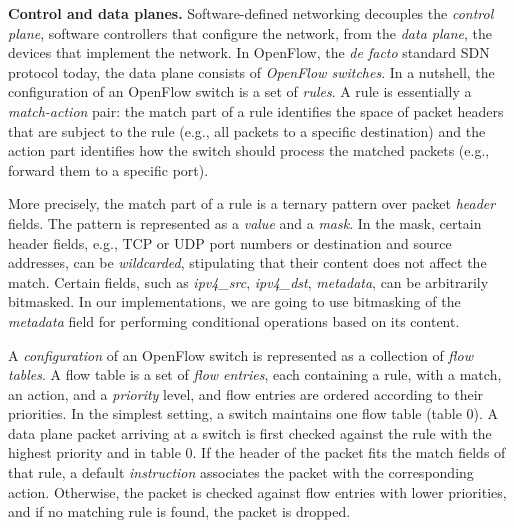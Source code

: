 \documentclass[conference]{sigcomm-alternate}
\newcommand{\liron}[1]{\textit{\textcolor{mygreen}{[liron]: #1}}} %
\begin{document}
\vspace{1mm}
\noindent\textbf{Control and data planes.} Software-defined networking
decouples the \emph{control plane}, software
controllers that configure the network, from the \emph{data plane}, the
devices that implement the network.
%
In OpenFlow, the \emph{de facto} standard SDN protocol
today, the data plane consists of \emph{OpenFlow switches}.
In a nutshell, the configuration of an OpenFlow switch is a set of
\emph{rules}.
A rule is essentially a \emph{match-action} pair:
the match part of a rule identifies the space of packet headers that are
subject to the rule (e.g., all packets to a specific destination) and
the action part identifies how the switch should process the matched
packets (e.g., forward them to a specific port).

More precisely, the match part of a rule is
a ternary pattern over packet \emph{header} fields.
The pattern is represented as a \emph{value} and a \emph{mask}.
In the mask, certain header fields, e.g., TCP or UDP port numbers or destination and source
addresses, can be \emph{wildcarded}, stipulating that their content does
not affect the match.
Certain fields, such as \emph{ipv4\_src}, \emph{ipv4\_dst}, \emph{metadata}, can be arbitrarily
bitmasked.
In our implementations, we are going to use bitmasking of the \emph{metadata}
field for performing conditional operations based on  its content.

A \emph{configuration} of an OpenFlow switch is represented as a
collection of \emph{flow tables}.
A flow table is a set of \emph{flow entries}, each containing a rule,
with a match, an action, and a \emph{priority} level, and flow entries
are ordered according to their priorities.
In the simplest setting, a switch maintains one flow table (table 0).
A data plane packet arriving at a switch is first checked against
the rule with the highest priority and in table $0$.
If the header of the packet fits the match fields of that rule,
a default \emph{instruction} associates the packet with the corresponding action.
Otherwise, the packet is checked against flow  entries with lower
priorities, and if no matching rule is found, the packet is dropped.
\end{document}
